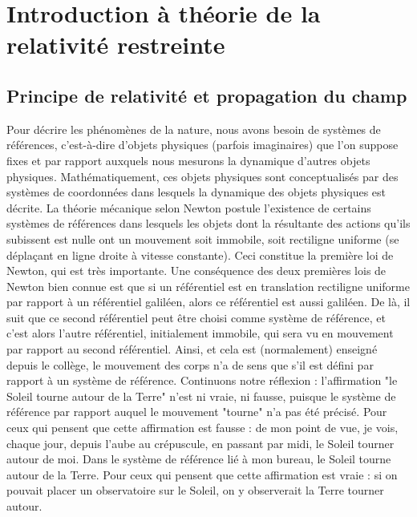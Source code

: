 \chapter{Introduction à théorie de la relativité restreinte}
	

	\section{Principe de relativité et propagation du champ}
		Pour décrire les phénomènes de la nature, nous avons besoin de systèmes de références, c'est-à-dire d'objets physiques (parfois imaginaires) que l'on suppose fixes et par rapport auxquels nous mesurons la dynamique d'autres objets physiques. Mathématiquement, ces objets physiques sont conceptualisés par des systèmes de coordonnées dans lesquels la dynamique des objets physiques est décrite. La théorie mécanique selon Newton postule l'existence de certains systèmes de références dans lesquels les objets dont la résultante des actions qu'ils subissent est nulle ont un mouvement soit immobile, soit rectiligne uniforme (se déplaçant en ligne droite à vitesse constante). Ceci constitue la première loi de Newton, qui est très importante. Une conséquence des deux premières lois de Newton bien connue est que si un référentiel est en translation rectiligne uniforme par rapport à un référentiel galiléen, alors ce référentiel est aussi galiléen. De là, il suit que ce second référentiel peut être choisi comme système de référence, et c'est alors l'autre référentiel, initialement immobile, qui sera vu en mouvement par rapport au second référentiel. Ainsi, et cela est (normalement) enseigné depuis le collège, le mouvement des corps n'a de sens que s'il est défini par rapport à un système de référence. Continuons notre réflexion : l'affirmation "le Soleil tourne autour de la Terre" n'est ni vraie, ni fausse, puisque le système de référence par rapport auquel le mouvement "tourne" n'a pas été précisé. Pour ceux qui pensent que cette affirmation est fausse : de mon point de vue, je vois, chaque jour, depuis l'aube au crépuscule, en passant par midi, le Soleil tourner autour de moi. Dans le système de référence lié à mon bureau, le Soleil tourne autour de la Terre. Pour ceux qui pensent que cette affirmation est vraie : si on pouvait placer un observatoire sur le Soleil, on y observerait la Terre tourner autour.

